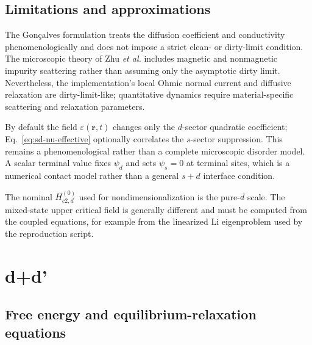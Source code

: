 \documentclass[11pt]{article}
\begin{document}
\subsection{Limitations and approximations}

The Gon\c{c}alves formulation treats the diffusion coefficient and conductivity
phenomenologically and does not impose a strict clean- or dirty-limit condition.
The microscopic theory of Zhu \textit{et al.} includes magnetic and nonmagnetic
impurity scattering rather than assuming only the asymptotic dirty limit.
Nevertheless, the implementation's local Ohmic normal current and diffusive
relaxation are dirty-limit-like; quantitative dynamics require material-specific
scattering and relaxation parameters.

By default the field $\varepsilon(\mathbf r,t)$ changes only the $d$-sector
quadratic coefficient; Eq.~\eqref{eq:sd-nu-effective} optionally correlates
the $s$-sector suppression.  This remains a phenomenological rather than a
complete microscopic disorder model.  A scalar
terminal value fixes $\psi_d$ and sets
$\psi_s=0$ at terminal sites, which is a numerical contact model rather than a
general $s+d$ interface condition.

The nominal $H_{c2,d}^{(0)}$ used for nondimensionalization is the pure-$d$
scale.  The mixed-state upper critical field is generally different and must
be computed from the coupled equations, for example from the linearized Li
eigenproblem used by the reproduction script.

\section{d+d' \cite{Lei2000, Wang1999Orbital}}

\subsection{Free energy and equilibrium-relaxation equations}
\end{document}
